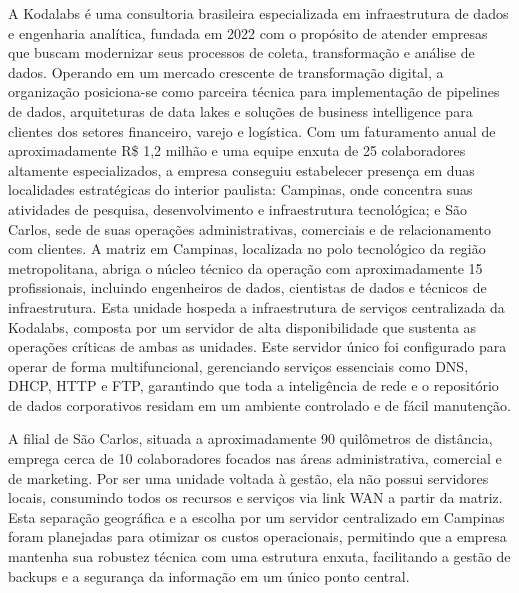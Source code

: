 \documentclass[12pt,a4paper]{article}
\begin{document}
A Kodalabs é uma consultoria brasileira especializada em infraestrutura de dados e engenharia analítica, fundada em 2022 com o propósito de atender empresas que buscam modernizar seus processos de coleta, transformação e análise de dados. Operando em um mercado crescente de transformação digital, a organização posiciona-se como parceira técnica para implementação de pipelines de dados, arquiteturas de data lakes e soluções de business intelligence para clientes dos setores financeiro, varejo e logística. Com um faturamento anual de aproximadamente R\$ 1,2 milhão e uma equipe enxuta de 25 colaboradores altamente especializados, a empresa conseguiu estabelecer presença em duas localidades estratégicas do interior paulista: Campinas, onde concentra suas atividades de pesquisa, desenvolvimento e infraestrutura tecnológica; e São Carlos, sede de suas operações administrativas, comerciais e de relacionamento com clientes.
A matriz em Campinas, localizada no polo tecnológico da região metropolitana, abriga o núcleo técnico da operação com aproximadamente 15 profissionais, incluindo engenheiros de dados, cientistas de dados e técnicos de infraestrutura. Esta unidade hospeda a infraestrutura de serviços centralizada da Kodalabs, composta por um servidor de alta disponibilidade que sustenta as operações críticas de ambas as unidades. Este servidor único foi configurado para operar de forma multifuncional, gerenciando serviços essenciais como DNS, DHCP, HTTP e FTP, garantindo que toda a inteligência de rede e o repositório de dados corporativos residam em um ambiente controlado e de fácil manutenção.

A filial de São Carlos, situada a aproximadamente 90 quilômetros de distância, emprega cerca de 10 colaboradores focados nas áreas administrativa, comercial e de marketing. Por ser uma unidade voltada à gestão, ela não possui servidores locais, consumindo todos os recursos e serviços via link WAN a partir da matriz. Esta separação geográfica e a escolha por um servidor centralizado em Campinas foram planejadas para otimizar os custos operacionais, permitindo que a empresa mantenha sua robustez técnica com uma estrutura enxuta, facilitando a gestão de backups e a segurança da informação em um único ponto central.
\end{document}
